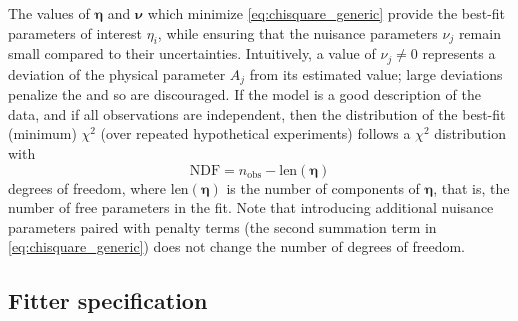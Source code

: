 The values of $\boldsymbol{\eta}$ and $\boldsymbol{\nu}$
which minimize \cref{eq:chisquare_generic}
provide the best-fit parameters of interest $\eta_i$,
while ensuring that the nuisance parameters $\nu_j$
remain small compared to their uncertainties.
Intuitively, a value of $\nu_j \neq 0$ represents
a deviation of the physical parameter $A_j$ from its estimated value;
large deviations penalize the \chisquare{} and so are discouraged.
If the model is a good description of the data,
and if all observations are independent,
then the distribution of the best-fit (minimum) $\chi^2$
(over repeated hypothetical experiments)
follows a $\chi^2$ distribution with
\begin{equation}\label{eq:ndf_def}
    \text{NDF} = n_\text{obs} - \text{len}(\boldsymbol{\eta})
\end{equation}
degrees of freedom,
where $\text{len}(\boldsymbol{\eta})$ is the number of components of $\boldsymbol{\eta}$,
that is, the number of free parameters in the fit.
Note that introducing additional nuisance parameters
paired with penalty terms (the second summation term in \cref{eq:chisquare_generic})
does not change the number of degrees of freedom.

\subsection{Fitter specification}
\label{subsec:fitter_specification}

